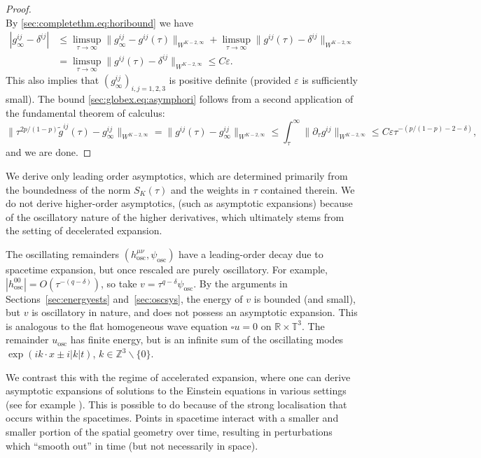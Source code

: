 \documentclass{article}
\newcommand{\RR}{\mathbb{R}}
\newcommand{\ZZ}{\mathbb{Z}}
\newcommand{\TT}{\mathbb{T}}
\newcommand{\osc}{\mathrm{osc}}
\newcommand{\wt}{\widetilde}
\newcommand{\ve}{\varepsilon}
\newcommand{\pa}{\partial}
\newcommand{\bs}{\backslash}
\newcommand{\ra}{\rightarrow}
\begin{document}
\begin{proof}
\begin{equation}
    \end{equation}
    By \eqref{sec:completethm.eq:horibound} we have
    \begin{align}
        |g_\infty^{ij}-\delta^{ij}| &\leq \limsup_{\tau\ra\infty}\|g_{\infty}^{ij} - g^{ij}(\tau)\|_{W^{K-2,\infty}}+\limsup_{\tau\ra\infty}\|g^{ij}(\tau) - \delta^{ij}\|_{W^{K-2,\infty}}\nonumber\\
        & = \limsup_{\tau\ra\infty}\|g^{ij}(\tau) - \delta^{ij}\|_{W^{K-2,\infty}} \leq C\ve.
    \end{align}
    This also implies that $(g_\infty^{ij})_{i,j=1,2,3}$ is positive definite (provided $\ve$ is sufficiently small). The bound \eqref{sec:globex.eq:asymphori} follows from a second application of the fundamental theorem of calculus:
    \begin{equation}
        \|\tau^{2p/(1-p)}\wt{g}^{ij}(\tau) - g_{\infty}^{ij}\|_{W^{K-2,\infty}} = \|g^{ij}(\tau) - g_{\infty}^{ij}\|_{W^{K-2,\infty}}\leq \int_{\tau}^\infty\|\pa_\tau g^{ij}\|_{W^{K-2,\infty}} \leq C\ve \tau^{-(p/(1-p)-2-\delta)},
    \end{equation}
    and we are done.
\end{proof}
\begin{remark}
    We derive only leading order asymptotics, which are determined primarily from the boundedness of the norm $S_K(\tau)$ and the weights in $\tau$ contained therein. We do not derive higher-order asymptotics, (such as asymptotic expansions) because of the oscillatory nature of the higher derivatives, which ultimately stems from the setting of decelerated expansion.

    The oscillating remainders $(h_{\osc}^{\mu\nu},\psi_{\osc})$ have a leading-order decay due to spacetime expansion, but once rescaled are purely oscillatory. For example, $|h_{\osc}^{00}| =  O(\tau^{-(q-\delta)})$, so take $v = \tau^{q-\delta} \psi_{\osc}$. By the arguments in Sections~\ref{sec:energyests} and~\ref{sec:oscsys}, the energy of $v$ is bounded (and small), but $v$ is oscillatory in nature, and does not possess an asymptotic expansion. This is analogous to the flat homogeneous wave equation $\square u = 0$ on $\RR\times\TT^3$. The remainder $u_{\osc}$ has finite energy, but is an infinite sum of the oscillating modes $\exp(ik\cdot x\pm i|k|t)$, $k \in \ZZ^3\bs\{0\}$.

    We contrast this with the regime of accelerated expansion, where one can derive asymptotic expansions of solutions to the Einstein equations in various settings (see for example \cite{HinVas:KdSexpandingstab:24}). This is possible to do because of the strong localisation that occurs within the spacetimes. Points in spacetime interact with a smaller and smaller portion of the spatial geometry over time, resulting in perturbations which ``smooth out'' in time (but not necessarily in space).
\end{remark}
\appendix
\end{document}
